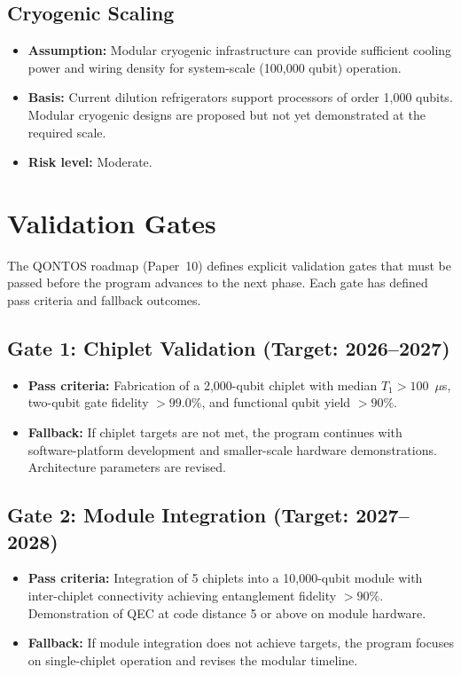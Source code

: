 \documentclass[conference]{IEEEtran}
\begin{document}
\subsection{Cryogenic Scaling}

\begin{itemize}
\item \textbf{Assumption:} Modular cryogenic infrastructure can provide sufficient cooling power and wiring density for system-scale (100,000 qubit) operation.
\item \textbf{Basis:} Current dilution refrigerators support processors of order 1,000 qubits. Modular cryogenic designs are proposed but not yet demonstrated at the required scale.
\item \textbf{Risk level:} Moderate.
\end{itemize}

\section{Validation Gates}
\label{sec:gates}

The QONTOS roadmap (Paper~10) defines explicit validation gates that must be passed before the program advances to the next phase. Each gate has defined pass criteria and fallback outcomes.

\subsection{Gate 1: Chiplet Validation (Target: 2026--2027)}

\begin{itemize}
\item \textbf{Pass criteria:} Fabrication of a 2,000-qubit chiplet with median $T_1 > 100$~$\mu$s, two-qubit gate fidelity $> 99.0\%$, and functional qubit yield $> 90\%$.
\item \textbf{Fallback:} If chiplet targets are not met, the program continues with software-platform development and smaller-scale hardware demonstrations. Architecture parameters are revised.
\end{itemize}

\subsection{Gate 2: Module Integration (Target: 2027--2028)}

\begin{itemize}
\item \textbf{Pass criteria:} Integration of 5 chiplets into a 10,000-qubit module with inter-chiplet connectivity achieving entanglement fidelity $> 90\%$. Demonstration of QEC at code distance 5 or above on module hardware.
\item \textbf{Fallback:} If module integration does not achieve targets, the program focuses on single-chiplet operation and revises the modular timeline.
\end{itemize}
\end{document}
